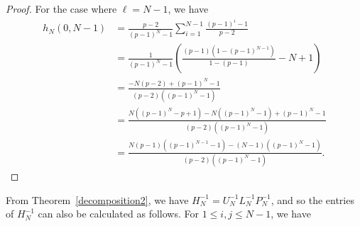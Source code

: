 \documentclass[12pt, leqno]{amsart}
\numberwithin{equation}{section}
\theoremstyle{plain}
\theoremstyle{definition}
\newcommand{\0}{\mathbf{0}}
\begin{document}
\begin{proof}
For the case where $\ell=N-1$, we have
\begin{align*}
h_N(0,N-1)&=\frac{p-2}{(p-1)^{N}-1}\sum_{i=1}^{N-1}\frac{(p-1)^i-1}{p-2}\\
&=\frac{1}{(p-1)^{N}-1}(\frac{(p-1)(1-(p-1)^{N-1})}{1-(p-1)}-N+1)\\
&=\frac{-N(p-2)+(p-1)^N-1}{(p-2)((p-1)^N-1)}\\
&=\frac{N((p-1)^N-p+1)-N((p-1)^N-1)+(p-1)^N-1}{(p-2)((p-1)^N-1)}\\
&=\frac{N(p-1)((p-1)^{N-1}-1)-(N-1)((p-1)^N-1)}{(p-2)((p-1)^N-1)}.
\end{align*}
\end{proof}

From Theorem~\ref{decomposition2}, we have $H_N^{-1}=U_N^{-1}L_N^{-1}P_N^{-1}$, and so the entries of $H^{-1}_N$ can also be calculated as follows. 
For $1\leq i,j\leq N-1$, we have 
\end{document}
